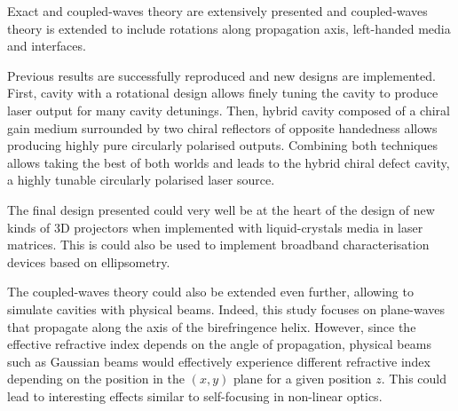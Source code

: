 Exact and coupled-waves theory are extensively presented and coupled-waves theory is extended to include rotations along propagation axis, left-handed media and interfaces. 

Previous results are successfully reproduced and new designs are implemented. First, cavity with a rotational design allows finely tuning the cavity to produce laser output for many cavity detunings. Then, hybrid cavity composed of a chiral gain medium surrounded by two chiral reflectors of opposite handedness allows producing highly pure circularly polarised outputs. Combining both techniques allows taking the best of both worlds and leads to the hybrid chiral defect cavity, a highly tunable circularly polarised laser source. 

The final design presented could very well be at the heart of the design of new kinds of 3D projectors when implemented with liquid-crystals media in laser matrices. This is could also be used to implement broadband characterisation devices based on ellipsometry. 

The coupled-waves theory could also be extended even further, allowing to simulate cavities with physical beams. Indeed, this study focuses on plane-waves that propagate along the axis of the birefringence helix. However, since the effective refractive index depends on the angle of propagation, physical beams such as Gaussian beams would effectively experience different refractive index depending on the position in the $(x,y)$ plane for a given position $z$. This could lead to interesting effects similar to self-focusing in non-linear optics\cites{poy_chirality-enhanced_2020}{shishkov_polarization_2020}.